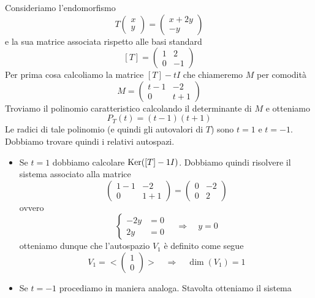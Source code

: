\begin{example}
	Consideriamo l'endomorfismo
	\[
		T \begin{pmatrix} x \\ y \end{pmatrix} =
		\begin{pmatrix}
			x + 2y \\
			-y
		\end{pmatrix}
	\]
	e la sua matrice associata rispetto alle basi standard
	\[
		[T] = \begin{pmatrix}
			1 & 2  \\
			0 & -1
		\end{pmatrix}
	\]
	Per prima cosa calcoliamo la matrice $[T] - tI$ che chiameremo $M$ per comodità
	\[
		M = \begin{pmatrix}
			t - 1 & -2    \\
			0     & t + 1
		\end{pmatrix}
	\]
	Troviamo il polinomio caratteristico calcolando il determinante di $M$ e otteniamo
	\[
		P_T(t) = (t - 1)(t + 1)
	\]
	Le radici di tale polinomio (e quindi gli autovalori di $T$) sono $t = 1$ e $t = -1$.
	Dobbiamo trovare quindi i relativi autospazi.
	\begin{itemize}
		\item Se $t = 1$ dobbiamo calcolare $\operatorname{Ker}([T] - 1I)$. Dobbiamo quindi risolvere il
		      sistema associato alla matrice
		      \[
			      \begin{pmatrix}
				      1 - 1 & -2    \\
				      0     & 1 + 1
			      \end{pmatrix} =
			      \begin{pmatrix}
				      0 & -2 \\
				      0 & 2
			      \end{pmatrix}
		      \]
		      ovvero
		      \[
			      \begin{cases}
				      -2y & = 0 \\
				      2y  & = 0
			      \end{cases} \quad \Rightarrow \quad
			      y = 0
		      \]
		      otteniamo dunque che l'autospazio $V_1$ è definito come segue
		      \[
			      V_1 = < \begin{pmatrix} 1 \\ 0 \end{pmatrix} > \quad \Rightarrow \quad
			      \dim(V_1) = 1
		      \]
		\item Se $t = -1$ procediamo in maniera analoga. Stavolta otteniamo il sistema
		      \[
\]
\end{itemize}
\end{example}
